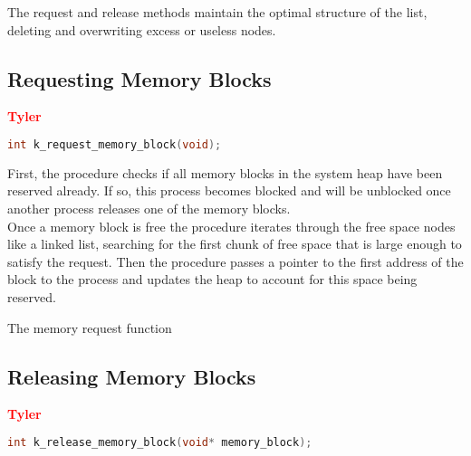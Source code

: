 \documentclass[12pt]{report}
\begin{document}
The request and release methods maintain the optimal structure of the list, deleting and overwriting excess or useless nodes.\\


\subsection{Requesting Memory Blocks}

\textcolor{red}{\textbf{Tyler}} \\
\begin{minipage}{\textwidth}
\begin{lstlisting}[language=C, frame=single]
int k_request_memory_block(void);
\end{lstlisting}
\end{minipage}

First, the procedure checks if all memory blocks in the system heap have been reserved already. If so, this process becomes blocked and will be unblocked once another process releases one of the memory blocks. \\
Once a memory block is free the procedure iterates through the free space nodes like a linked list, searching for the first chunk of free space that is large enough to satisfy the request. Then the procedure passes a pointer to the first address of the block to the process and updates the heap to account for this space being reserved. \\

\begin{algorithm}
  \caption{The memory request function}
  \begin{algorithmic}[1]
	  \EndWhile
    \EndProcedure
  \end{algorithmic}
\end{algorithm}

\subsection{Releasing Memory Blocks}

\textcolor{red}{\textbf{Tyler}} \\
\begin{minipage}{\textwidth}
\begin{lstlisting}[language=C, frame=single]
int k_release_memory_block(void* memory_block);
\end{lstlisting}
\end{minipage}
\end{document}
